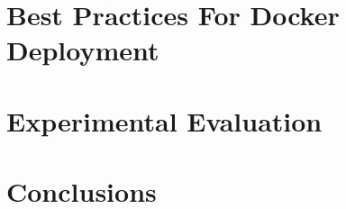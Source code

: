 \documentclass[a4paper,12pt]{article}
\begin{document}




\newpage

\section{Best Practices For Docker Deployment}

\newpage

\section{Experimental Evaluation}

\newpage

\section{Conclusions}

\newpage
\end{document}
